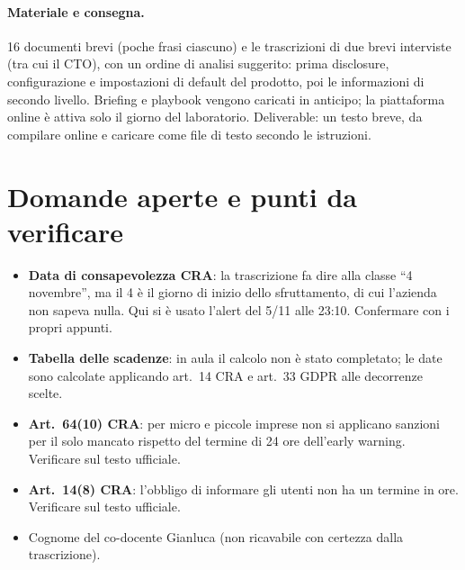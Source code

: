 \paragraph{Materiale e consegna.} 16 documenti brevi (poche frasi ciascuno) e le trascrizioni di due
brevi interviste (tra cui il CTO), con un ordine di analisi suggerito: prima disclosure, configurazione
e impostazioni di default del prodotto, poi le informazioni di secondo livello. Briefing e playbook
vengono caricati in anticipo; la piattaforma online è attiva solo il giorno del laboratorio.
Deliverable: un testo breve, da compilare online e caricare come file di testo secondo le istruzioni.

\section{Domande aperte e punti da verificare}

\begin{verifica}
\begin{itemize}
  \item \textbf{Data di consapevolezza CRA}: la trascrizione fa dire alla classe ``4 novembre'', ma il
    4 è il giorno di inizio dello sfruttamento, di cui l'azienda non sapeva nulla. Qui si è usato
    l'alert del 5/11 alle 23:10. Confermare con i propri appunti.
  \item \textbf{Tabella delle scadenze}: in aula il calcolo non è stato completato; le date sono
    calcolate applicando art.~14 CRA e art.~33 GDPR alle decorrenze scelte.
  \item \textbf{Art.~64(10) CRA}: per micro e piccole imprese non si applicano sanzioni per il solo
    mancato rispetto del termine di 24 ore dell'early warning. Verificare sul testo ufficiale.
  \item \textbf{Art.~14(8) CRA}: l'obbligo di informare gli utenti non ha un termine in ore.
    Verificare sul testo ufficiale.
  \item Cognome del co-docente Gianluca (non ricavabile con certezza dalla trascrizione).
\end{itemize}
\end{verifica}
